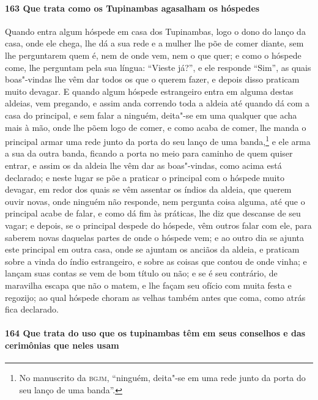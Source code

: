 \paragraph{163 Que trata como os Tupinambas agasalham os hóspedes}

Quando entra algum hóspede em casa dos Tupinambas, logo o dono do lanço da casa, onde ele
chega, lhe dá a sua rede e a mulher lhe põe de comer diante, sem lhe perguntarem quem é,
nem de onde vem, nem o que quer; e como o hóspede come, lhe perguntam pela sua língua:
``Vieste já?'', e ele responde ``Sim'', as quais boas"-vindas lhe vêm dar todos os que o
querem fazer, e depois disso praticam muito devagar. E quando algum hóspede estrangeiro
entra em alguma destas aldeias, vem pregando, e assim anda correndo toda a aldeia até
quando dá com a casa do principal, e sem falar a ninguém, deita"-se em uma qualquer que
acha mais à mão, onde lhe põem logo de comer, e como acaba de comer, lhe manda o principal
armar uma rede junto da porta do seu lanço de uma banda,\footnote{ No manuscrito da
\textsc{bgjm}, ``ninguém, deita"-se em uma rede junto da porta do seu lanço de uma
banda''.} e ele arma a sua da outra banda, ficando a porta no meio para caminho de quem
quiser entrar, e assim os da aldeia lhe vêm dar as boas"-vindas, como acima está declarado;
e neste lugar se põe a praticar o principal com o hóspede muito devagar, em redor dos
quais se vêm assentar os índios da aldeia, que querem ouvir novas, onde ninguém não
responde, nem pergunta coisa alguma, até que o principal acabe de falar, e como dá fim às
práticas, lhe diz que descanse de seu vagar; e depois, se o principal despede do hóspede,
vêm outros falar com ele, para saberem novas daquelas partes de onde o hóspede vem; e ao
outro dia se ajunta este principal em outra casa, onde se ajuntam os anciãos da aldeia, e
praticam sobre a vinda do índio estrangeiro, e sobre as coisas que contou de onde vinha; e
lançam suas contas se vem de bom título ou não; e se é seu contrário, de maravilha escapa
que não o matem, e lhe façam seu ofício com muita festa e regozijo; ao qual hóspede choram
as velhas também antes que coma, como atrás fica declarado.

\paragraph{164 Que trata do uso que os tupinambas têm em seus conselhos e das cerimônias
que neles usam}

